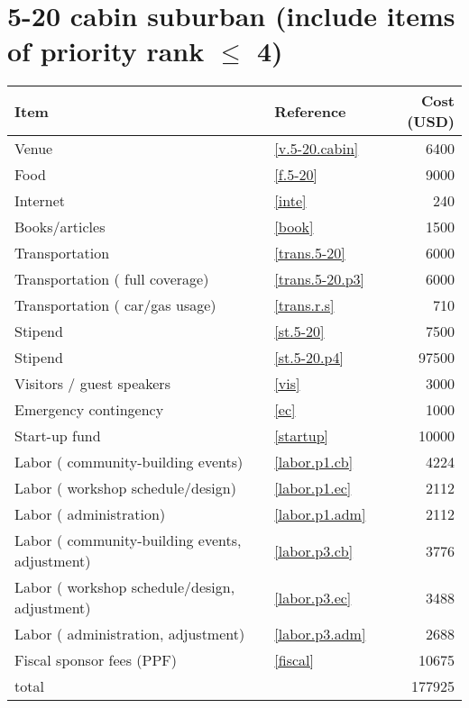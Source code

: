 \section*{5-20 cabin suburban (include items of priority rank $\leq$ 4)}
\begin{center}
\begin{tabular}{llr}
Item & Reference & Cost (USD) \\ \hline
Venue & \ref{v.5-20.cabin} & 6400 \\
Food & \ref{f.5-20} & 9000 \\
Internet & \ref{inte} & 240 \\
Books/articles & \ref{book} & 1500 \\
Transportation & \ref{trans.5-20} & 6000 \\
Transportation ( full coverage) & \ref{trans.5-20.p3} & 6000 \\
Transportation ( car/gas usage) & \ref{trans.r.s} & 710 \\
Stipend & \ref{st.5-20} & 7500 \\
Stipend & \ref{st.5-20.p4} & 97500 \\
Visitors / guest speakers & \ref{vis} & 3000 \\
Emergency contingency & \ref{ec} & 1000 \\
Start-up fund & \ref{startup} & 10000 \\
Labor ( community-building events) & \ref{labor.p1.cb} & 4224 \\
Labor ( workshop schedule/design) & \ref{labor.p1.ec} & 2112 \\
Labor ( administration) & \ref{labor.p1.adm} & 2112 \\
Labor ( community-building events, adjustment) & \ref{labor.p3.cb} & 3776 \\
Labor ( workshop schedule/design, adjustment) & \ref{labor.p3.ec} & 3488 \\
Labor ( administration, adjustment) & \ref{labor.p3.adm} & 2688 \\
Fiscal sponsor fees (PPF) & \ref{fiscal} & 10675 \\ \hline
total &  & 177925
\end{tabular}
\end{center}
\newpage

